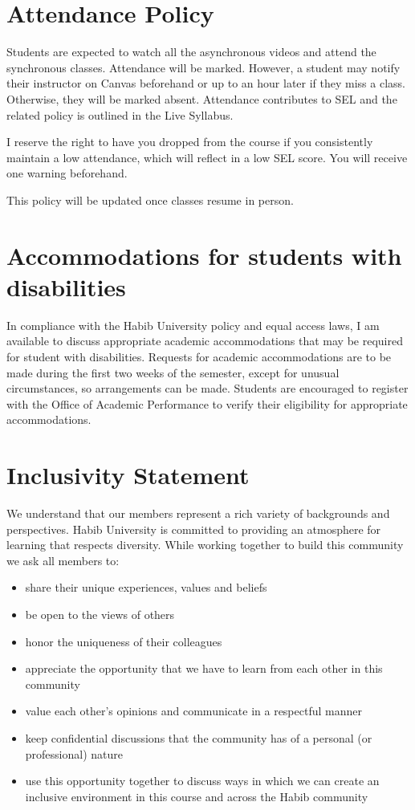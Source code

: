 \documentclass[a4paper]{article}
\begin{document}
\section{Attendance Policy}

Students are expected to watch all the asynchronous videos and attend the synchronous classes. Attendance will be marked. However, a student may notify their instructor on Canvas beforehand or up to an hour later if they miss a class. Otherwise, they will be marked absent. Attendance contributes to SEL and the related policy is outlined in the Live Syllabus.

I reserve the right to have you dropped from the course if you consistently maintain a low attendance, which will reflect in a low SEL score. You will receive one warning beforehand.

This policy will be updated once classes resume in person.

\section{Accommodations for students with disabilities}

In compliance with the Habib University policy and equal access laws, I am available to discuss appropriate academic accommodations that may be required for student with disabilities. Requests for academic accommodations are to be made during the first two weeks of the semester, except for unusual circumstances, so arrangements can be made. Students are encouraged to register with the Office of Academic Performance to verify their eligibility for appropriate accommodations.

\section{Inclusivity Statement}


We understand that our members represent a rich variety of backgrounds and perspectives. Habib University is committed to providing an atmosphere for learning that respects diversity. While working together to build this community we ask all members to:
\begin{itemize}
\item share their unique experiences, values and beliefs
\item be open to the views of others 
\item honor the uniqueness of their colleagues
\item appreciate the opportunity that we have to learn from each other in this community
\item value each other’s opinions and communicate in a respectful manner
\item keep confidential discussions that the community has of a personal (or professional) nature 
\item use this opportunity together to discuss ways in which we can create an inclusive environment in this course and across the Habib community 
\end{itemize}
\end{document}
